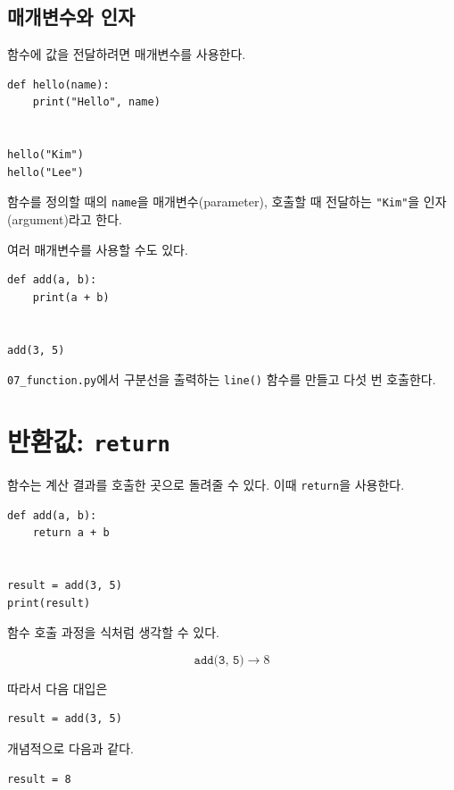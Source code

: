 \documentclass[11pt,a4paper]{article}
\begin{document}
\subsection{매개변수와 인자}

함수에 값을 전달하려면 매개변수를 사용한다.

\begin{lstlisting}
def hello(name):
    print("Hello", name)


hello("Kim")
hello("Lee")
\end{lstlisting}

함수를 정의할 때의 \texttt{name}을 매개변수(parameter), 호출할 때 전달하는 \texttt{"Kim"}을 인자(argument)라고 한다.

여러 매개변수를 사용할 수도 있다.

\begin{lstlisting}
def add(a, b):
    print(a + b)


add(3, 5)
\end{lstlisting}

\begin{practicebox}
\texttt{07\_function.py}에서 구분선을 출력하는 \texttt{line()} 함수를 만들고 다섯 번 호출한다.
\end{practicebox}

\section{반환값: \texttt{return}}

함수는 계산 결과를 호출한 곳으로 돌려줄 수 있다. 이때 \texttt{return}을 사용한다.

\begin{lstlisting}
def add(a, b):
    return a + b


result = add(3, 5)
print(result)
\end{lstlisting}

함수 호출 과정을 식처럼 생각할 수 있다.

\[
\texttt{add(3, 5)} \longrightarrow 8
\]

따라서 다음 대입은

\begin{lstlisting}
result = add(3, 5)
\end{lstlisting}

개념적으로 다음과 같다.

\begin{lstlisting}
result = 8
\end{lstlisting}
\end{document}

